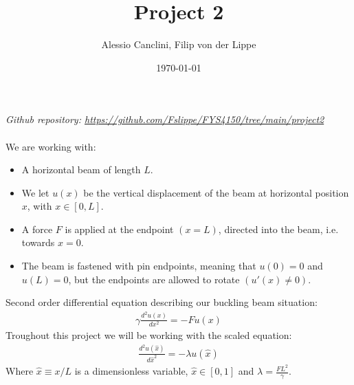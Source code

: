 \documentclass[english,notitlepage]{revtex4-1}  %
\begin{document}
\title{Project 2}
\author{Alessio Canclini, Filip von der Lippe}
\date{\today}
\noaffiliation                            %


\maketitle

\textit{Github repository: \url{https://github.com/Fslippe/FYS4150/tree/main/project2}}
\\
\\
We are working with:
\begin{itemize}
    \item A horizontal beam of length $L$.

    \item We let $u(x)$ be the vertical displacement of the beam at horizontal position $x$, with $x \in [0,L]$.

    \item A force $F$ is applied at the endpoint $(x = L)$, directed into the beam, i.e. towards $x = 0$.

    \item The beam is fastened with pin endpoints, meaning that $u(0) = 0$ and $u(L) = 0$, but the endpoints are allowed to rotate $(u'(x) \neq 0)$.
\end{itemize}
Second order differential equation describing our buckling beam situation:
\begin{align}
    \gamma \frac{d^2u(x)}{dx^2} = - F u(x)
    \label{eq:diff}
\end{align}
Troughout this project we will be working with the scaled equation:
\begin{align}
    \frac{d^2u(\hat{x})}{d \hat{x}^2} = - \lambda u(\hat{x})
    \label{eq:scaled}
\end{align}
Where $\hat{x} \equiv x / L$ is a dimensionless variable, $\hat{x} \in [0,1]$ and $\lambda = \frac{FL^2}{\gamma}$.
\end{document}
